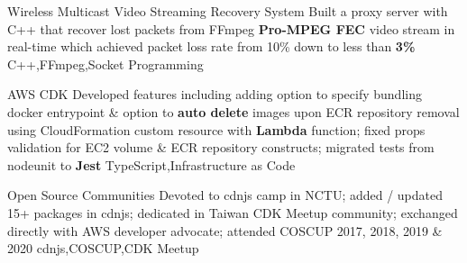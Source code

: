 \begin{projects}
  \project
  {Wireless Multicast Video Streaming Recovery System}{}
  {}
  {Built a proxy server with C++ that recover lost packets from FFmpeg \textbf{Pro-MPEG FEC} video stream in real-time which achieved packet loss rate from 10\% down to less than \textbf{3\%}}
  {C++,FFmpeg,Socket Programming}

  \project
  {AWS CDK}{}
  {}
  {Developed features including adding option to specify bundling docker entrypoint \& option to \textbf{auto delete} images upon ECR repository removal using CloudFormation custom resource with \textbf{Lambda} function; fixed props validation for EC2 volume \& ECR repository constructs; migrated tests from nodeunit to \textbf{Jest}}
  {TypeScript,Infrastructure as Code}

  \project
  {Open Source Communities}{  }
  {}
  {Devoted to cdnjs camp in NCTU; added / updated 15+ packages in cdnjs; dedicated in Taiwan CDK Meetup community; exchanged directly with AWS developer advocate; attended COSCUP 2017, 2018, 2019 \& 2020}
  {cdnjs,COSCUP,CDK Meetup}
\end{projects}
